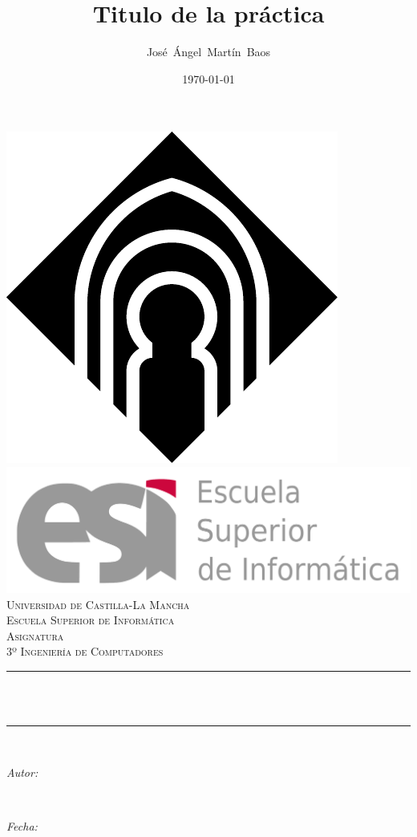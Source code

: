 \documentclass[11pt]{article}
\title{Titulo de la práctica}							%
\author{José~Ángel~Martín~Baos}							%
\date{\today}											%
\makeatletter
\newcommand{\subject}{Asignatura}						%
\newcommand{\course}{3º Ingeniería de Computadores}		%
\newcommand{\dateText}{Fecha:}
\newcommand{\dateText}{Date:}
\let\thetitle\@title
\let\theauthor\@author
\let\thedate\@date
\makeatother
\begin{document}

\begin{titlepage}
	\centering
    \includegraphics[scale = 0.40]{uclm_logo.pdf}\\[1.0 cm]	%
    \includegraphics[scale = 0.25]{esi.pdf}\\[1.0 cm]
    \textsc{\LARGE Universidad de Castilla-La Mancha}\\[0.5 cm]	%
    \textsc{\LARGE Escuela Superior de Informática}\\[2.0 cm]
	\textsc{\Large \subject}\\[0.5 cm]				%
	\textsc{\large \course}\\[0.5 cm]						%
	\rule{\linewidth}{0.2 mm} \\[0.4 cm]
	{ \huge \bfseries \thetitle}\\
	\rule{\linewidth}{0.2 mm} \\[1.5 cm]
	
	\begin{minipage}{0.4\textwidth}
		\begin{flushleft} \large
			\emph{Autor:}\\
			\theauthor
			\end{flushleft}
			\end{minipage}~
			\begin{minipage}{0.4\textwidth}
			\begin{flushright} \large
			\emph{\dateText} \\
			\thedate
		\end{flushright}
	\end{minipage}\\[1.5 cm]
 

\end{titlepage}
\end{document}
